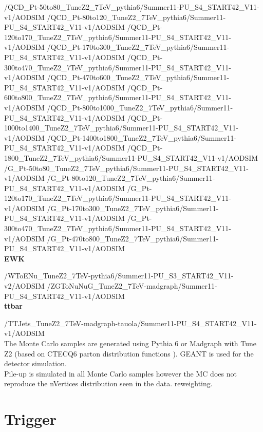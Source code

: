 /QCD\_Pt-50to80\_TuneZ2\_7TeV\_pythia6/Summer11-PU\_S4\_START42\_V11-v1/AODSIM
/QCD\_Pt-80to120\_TuneZ2\_7TeV\_pythia6/Summer11-PU\_S4\_START42\_V11-v1/AODSIM
/QCD\_Pt-120to170\_TuneZ2\_7TeV\_pythia6/Summer11-PU\_S4\_START42\_V11-v1/AODSIM
/QCD\_Pt-170to300\_TuneZ2\_7TeV\_pythia6/Summer11-PU\_S4\_START42\_V11-v1/AODSIM
/QCD\_Pt-300to470\_TuneZ2\_7TeV\_pythia6/Summer11-PU\_S4\_START42\_V11-v1/AODSIM
/QCD\_Pt-470to600\_TuneZ2\_7TeV\_pythia6/Summer11-PU\_S4\_START42\_V11-v1/AODSIM
/QCD\_Pt-600to800\_TuneZ2\_7TeV\_pythia6/Summer11-PU\_S4\_START42\_V11-v1/AODSIM
/QCD\_Pt-800to1000\_TuneZ2\_7TeV\_pythia6/Summer11-PU\_S4\_START42\_V11-v1/AODSIM
/QCD\_Pt-1000to1400\_TuneZ2\_7TeV\_pythia6/Summer11-PU\_S4\_START42\_V11-v1/AODSIM
/QCD\_Pt-1400to1800\_TuneZ2\_7TeV\_pythia6/Summer11-PU\_S4\_START42\_V11-v1/AODSIM
/QCD\_Pt-1800\_TuneZ2\_7TeV\_pythia6/Summer11-PU\_S4\_START42\_V11-v1/AODSIM \\

/G\_Pt-50to80\_TuneZ2\_7TeV\_pythia6/Summer11-PU\_S4\_START42\_V11-v1/AODSIM
/G\_Pt-80to120\_TuneZ2\_7TeV\_pythia6/Summer11-PU\_S4\_START42\_V11-v1/AODSIM
/G\_Pt-120to170\_TuneZ2\_7TeV\_pythia6/Summer11-PU\_S4\_START42\_V11-v1/AODSIM
/G\_Pt-170to300\_TuneZ2\_7TeV\_pythia6/Summer11-PU\_S4\_START42\_V11-v1/AODSIM
/G\_Pt-300to470\_TuneZ2\_7TeV\_pythia6/Summer11-PU\_S4\_START42\_V11-v1/AODSIM
/G\_Pt-470to800\_TuneZ2\_7TeV\_pythia6/Summer11-PU\_S4\_START42\_V11-v1/AODSIM \\

{\bf EWK}

/WToENu\_TuneZ2\_7TeV-pythia6/Summer11-PU\_S3\_START42\_V11-v2/AODSIM
/ZGToNuNuG\_TuneZ2\_7TeV-madgraph/Summer11-PU\_S4\_START42\_V11-v1/AODSIM \\

{\bf ttbar}

/TTJets\_TuneZ2\_7TeV-madgraph-tauola/Summer11-PU\_S4\_START42\_V11-v1/AODSIM \\

The Monte Carlo samples are generated using Pythia 6 \cite{pythia6} or Madgraph
\cite{madgraph} with Tune Z2 (based on CTECQ6 parton distribution functions 
\cite{tuneZ2}). GEANT \cite{geant}is used for the detector simulation. \\

Pile-up is simulated in all Monte Carlo samples however the MC does not
reproduce the nVertices distribution seen in the data. reweighting.

\section{Trigger}

